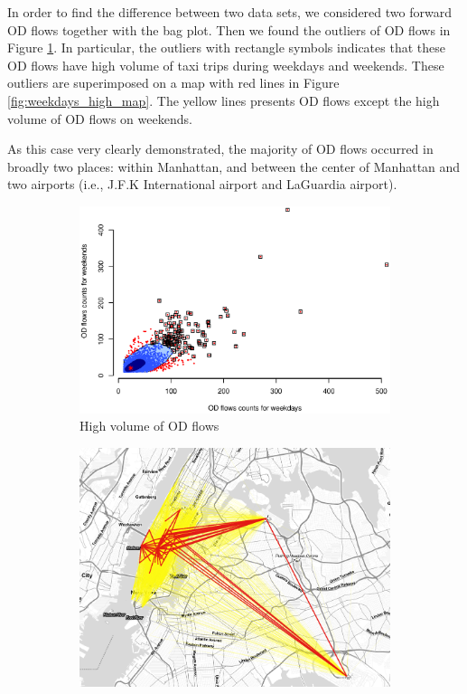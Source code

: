 \documentclass[a4paper,UKenglish]{lipics-v2016}
\begin{document}
In order to find the difference between two data sets, we considered two forward OD flows together with the bag plot. Then we found the outliers of OD flows in Figure \ref{fig:weekdays_high}. In particular, the outliers with rectangle symbols indicates that these OD flows have high volume of taxi trips during weekdays and weekends. These outliers are superimposed on a map with red lines in Figure \ref{fig:weekdays_high_map}. The yellow lines presents OD flows except the high volume of OD flows on weekends. 

As this case very clearly demonstrated, the majority of OD flows occurred in broadly two places: within Manhattan, and between the center of Manhattan and two airports (i.e., J.F.K International airport and LaGuardia airport).  
 

\begin{figure}
	\centering
	\begin{subfigure}[b]{0.49\textwidth}
		\includegraphics[width=\textwidth]{images/Outliers_high_weekdays_weekends.eps}
		\caption{High volume of OD flows}
		\label{fig:weekdays_high}
	\end{subfigure}
	\hfill %
	\begin{subfigure}[b]{0.49\textwidth}
		\includegraphics[width=\textwidth]{images/outliers2_high_weekdays_weekends.png}

\end{subfigure}
\end{figure}
\end{document}
